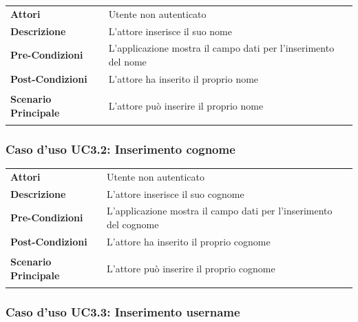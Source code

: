 \begin{longtable}{ l | p{11cm}}
	\hline
	\rowcolor{Gray}
	 \multicolumn{2}{c}{UC3.1 - Inserimento nome} \\
	 \hline
	\textbf{Attori} & Utente non autenticato \\
	\textbf{Descrizione} & L'attore inserisce il suo nome \\
	\textbf{Pre-Condizioni} & L'applicazione mostra il campo dati per l'inserimento del nome \\
	\textbf{Post-Condizioni} & L'attore ha inserito il proprio nome \\
	\textbf{Scenario Principale} & 
	\begin{enumerate*}[label=(\arabic*.),itemjoin={\newline}]
		\item L'attore può inserire il proprio nome
	\end{enumerate*}\\
\end{longtable}

\subsubsection{Caso d'uso UC3.2: Inserimento cognome}
\label{UC3_2}

\begin{longtable}{ l | p{11cm}}
	\hline
	\rowcolor{Gray}
	 \multicolumn{2}{c}{UC3.2 - Inserimento cognome} \\
	 \hline
	\textbf{Attori} & Utente non autenticato \\
	\textbf{Descrizione} & L'attore inserisce il suo cognome \\
	\textbf{Pre-Condizioni} & L'applicazione mostra il campo dati per l'inserimento del cognome \\
	\textbf{Post-Condizioni} & L'attore ha inserito il proprio cognome \\
	\textbf{Scenario Principale} & 
	\begin{enumerate*}[label=(\arabic*.),itemjoin={\newline}]
		\item L'attore può inserire il proprio cognome
	\end{enumerate*}\\
\end{longtable}

\subsubsection{Caso d'uso UC3.3: Inserimento username}
\label{UC3_3}

